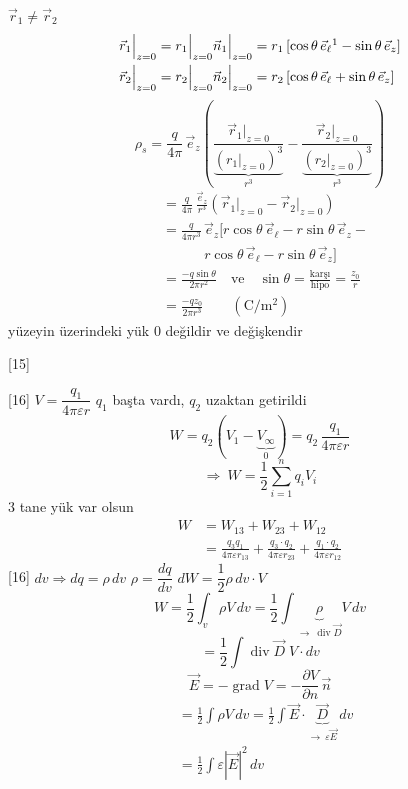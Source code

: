 \documentclass[11pt,a4paper]{article}
\begin{document}
\textcolor{turuncukalem}{$\vec r_1\neq\vec r_2$}
\begin{align*}
\vec r_1\Big|_{z=0}&=r_1\Big|_{z=0}\vec n_1\Big|_{z=0}=r_1\left[\cos\theta\,\vec e_\ell\footnotemark-\sin\theta\,\vec e_z\right]\\
\vec r_2\Big|_{z=0}&=r_2\Big|_{z=0}\vec n_2\Big|_{z=0}=r_2\left[\cos\theta\,\vec e_\ell+\sin\theta\,\vec e_z\right]
\end{align*}
\[
\rho_s=\frac{q}{4\pi}\,\vec e_z\left(\frac{\vec r_1\big|_{z=0}}{\underbrace{(r_1|_{z=0})^{3}}_{r^{3}}}-\frac{\vec r_2\big|_{z=0}}{\underbrace{(r_2|_{z=0})^{3}}_{r^{3}}}\right)
\]
\begin{align*}
&=\frac{q}{4\pi}\,\frac{\vec e_z}{r^{3}}\left(\vec r_1\big|_{z=0}-\vec r_2\big|_{z=0}\right)\\
&=\frac{q}{4\pi r^{3}}\,\vec e_z\Big[r\cos\theta\,\vec e_\ell-r\sin\theta\,\vec e_z-\\
&\qquad\quad r\cos\theta\,\vec e_\ell-r\sin\theta\,\vec e_z\Big]\\
&=\frac{-q\sin\theta}{2\pi r^{2}}\quad\text{ve}\quad\sin\theta=\frac{\text{karşı}}{\text{hipo}}=\frac{z_0}{r}\\
&=\frac{-qz_0}{2\pi r^{3}}\qquad(\mathrm{C/m^{2}})
\end{align*}
\textcolor{kirmizikalem}{yüzeyin üzerindeki yük 0 değildir ve değişkendir}

[15]

[16]
$V=\dfrac{q_1}{4\pi\varepsilon r}$ \quad $q_1$ başta vardı, $q_2$ uzaktan getirildi
\[
W=q_2\left(V_1-\underbrace{V_\infty}_{0}\right)=q_2\,\frac{q_1}{4\pi\varepsilon r}
\]
\[
\Rightarrow\ W=\frac12\sum_{i=1}^{n}q_iV_i
\]
3 tane yük var olsun
\begin{align*}
W&=W_{13}+W_{23}+W_{12}\\
&=\frac{q_3q_1}{4\pi\varepsilon r_{13}}+\frac{q_3\cdot q_2}{4\pi\varepsilon r_{23}}+\frac{q_1\cdot q_2}{4\pi\varepsilon r_{12}}
\end{align*}
[16]
\textcolor{turuncukalem}{$dv\Rightarrow dq=\rho\,dv$} \quad \textcolor{turuncukalem}{$\rho=\dfrac{dq}{dv}$} \quad $dW=\dfrac12\rho\,dv\cdot V$
\[
W=\frac12\int_v\rho V\,dv=\frac12\int\underbrace{\rho}_{\to\ \operatorname{div}\vec D}V\,dv
\]
\[
=\frac12\int\operatorname{div}\vec D\;V\cdot dv
\]
\[
\vec E=-\operatorname{grad}V=-\frac{\partial V}{\partial n}\,\vec n
\]
\begin{align*}
&=\frac12\int\rho V\,dv=\frac12\int\vec E\cdot\underbrace{\vec D}_{\to\ \varepsilon\vec E}\,dv\\
&=\frac12\int\varepsilon|\vec E|^{2}\,dv
\end{align*}
\end{document}
